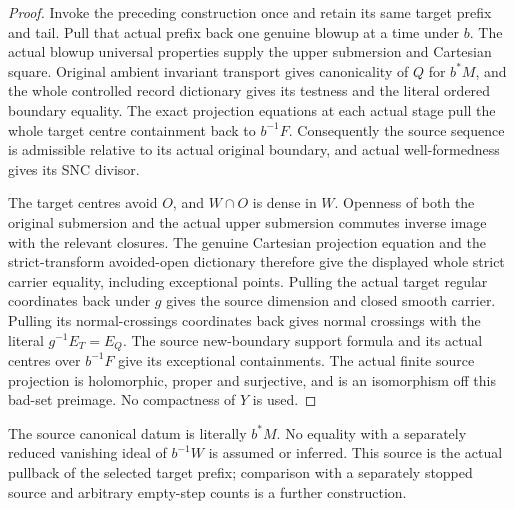 \begin{proof}
Invoke the preceding construction once and retain its same target
prefix and tail.  Pull that actual prefix back one genuine blowup at
a time under $b$.  The actual blowup universal properties supply the
upper submersion and Cartesian square.  Original ambient invariant
transport gives canonicality of $Q$ for $b^*M$, and the whole controlled
record dictionary gives its testness and the literal ordered boundary
equality.  The exact projection equations at each actual stage pull
the whole target centre containment back to $b^{-1}F$.  Consequently
the source sequence is admissible relative to its actual original
boundary, and actual well-formedness gives its SNC divisor.

The target centres avoid $O$, and $W\cap O$ is dense in $W$.
Openness of both the original submersion and the actual upper
submersion commutes inverse image with the relevant closures.  The
genuine Cartesian projection equation and the strict-transform
avoided-open dictionary therefore give the displayed whole strict
carrier equality, including exceptional points.  Pulling the actual
target regular coordinates back under $g$ gives the source dimension
and closed smooth carrier.  Pulling its normal-crossings coordinates
back gives normal crossings with the literal $g^{-1}E_T=E_Q$.
The source new-boundary support formula and its actual centres over
$b^{-1}F$ give its exceptional containments.  The actual finite source
projection is holomorphic, proper and surjective, and is an isomorphism
off this bad-set preimage.  No compactness of $Y$ is used.
\end{proof}

\begin{remark}
The source canonical datum is literally $b^*M$.  No equality with a
separately reduced vanishing ideal of $b^{-1}W$ is assumed or inferred.
This source is the actual pullback of the selected target prefix;
comparison with a separately stopped source and arbitrary empty-step
counts is a further construction.
\end{remark}
